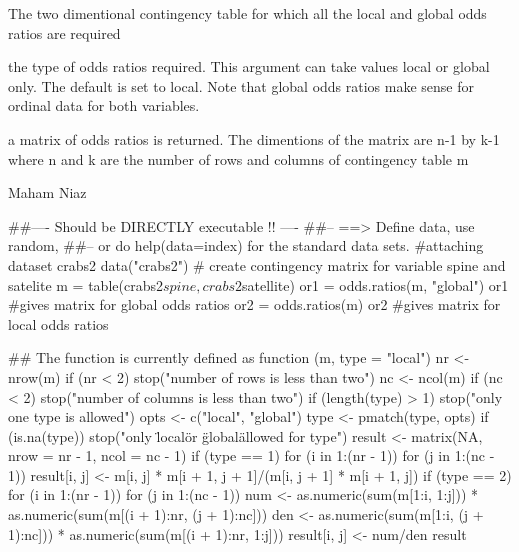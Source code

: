 \documentclass[letterpaper]{book}
\begin{document}
%
\begin{Arguments}
\begin{ldescription}
\item[\code{m}] 
The two dimentional contingency table for which all the local and global odds ratios are required

\item[\code{type}] 
the type of odds ratios required. This argument can take values local or global only. The default is set to local.
Note that global odds ratios make sense for ordinal data for both variables. 

\end{ldescription}
\end{Arguments}
%
\begin{Value}
\begin{ldescription}
\item[\code{result}] a matrix of odds ratios is returned. The dimentions  of the matrix are n-1 by k-1 where n and k are the number of rows and columns of contingency table m
\end{ldescription}





\end{Value}
%
\begin{Author}\relax
Maham Niaz
\end{Author}
%
\begin{Examples}
\begin{ExampleCode}
##---- Should be DIRECTLY executable !! ----
##-- ==>  Define data, use random,
##--	or do  help(data=index)  for the standard data sets.
 #attaching dataset crabs2
 data("crabs2")
 # create contingency matrix for variable spine and satelite 
 m = table(crabs2$spine, crabs2$satellite)
 or1 = odds.ratios(m, "global")
 or1 #gives matrix for global odds ratios
 or2 = odds.ratios(m)
 or2 #gives matrix for local odds ratios

## The function is currently defined as
function (m, type = "local") 
{
    nr <- nrow(m)
    if (nr < 2) 
        stop("number of rows is less than two")
    nc <- ncol(m)
    if (nc < 2) 
        stop("number of columns is less than two")
    if (length(type) > 1) 
        stop("only one type is allowed")
    opts <- c("local", "global")
    type <- pmatch(type, opts)
    if (is.na(type)) 
        stop("only \"local\" or \"global\" allowed for type")
    result <- matrix(NA, nrow = nr - 1, ncol = nc - 1)
    if (type == 1) 
        for (i in 1:(nr - 1)) for (j in 1:(nc - 1)) result[i, 
            j] <- m[i, j] * m[i + 1, j + 1]/(m[i, j + 1] * m[i + 
            1, j])
    if (type == 2) 
        for (i in 1:(nr - 1)) for (j in 1:(nc - 1)) {
            num <- as.numeric(sum(m[1:i, 1:j])) * as.numeric(sum(m[(i + 
                1):nr, (j + 1):nc]))
            den <- as.numeric(sum(m[1:i, (j + 1):nc])) * as.numeric(sum(m[(i + 
                1):nr, 1:j]))
            result[i, j] <- num/den
        }
    result
  }
\end{ExampleCode}
\end{Examples}
\end{document}
